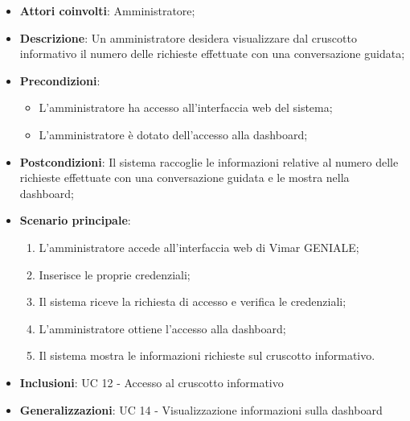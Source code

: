 \begin{itemize}
    \item \textbf{Attori coinvolti}: Amministratore;
    \item \textbf{Descrizione}: Un amministratore desidera visualizzare dal cruscotto informativo il numero delle richieste effettuate con una conversazione guidata;
    \item \textbf{Precondizioni}: 
        \begin{itemize}
            \item L’amministratore ha accesso all’interfaccia web del sistema;
            \item L’amministratore è dotato dell’accesso alla dashboard;
        \end{itemize}
    \item \textbf{Postcondizioni}: Il sistema raccoglie le informazioni relative al numero delle richieste effettuate con una conversazione guidata e le mostra nella dashboard;
    \item \textbf{Scenario principale}:
    \begin{enumerate}
    \item L’amministratore accede all’interfaccia web di Vimar GENIALE;
    \item Inserisce le proprie credenziali;
    \item Il sistema riceve la richiesta di accesso e verifica le credenziali;
    \item L’amministratore ottiene l’accesso alla dashboard;
    \item Il sistema mostra le informazioni richieste sul cruscotto informativo.
    \end{enumerate}
    \item \textbf{Inclusioni}: UC 12 - Accesso al cruscotto informativo
    \item \textbf{Generalizzazioni}: UC 14 - Visualizzazione informazioni sulla dashboard
\end{itemize}

